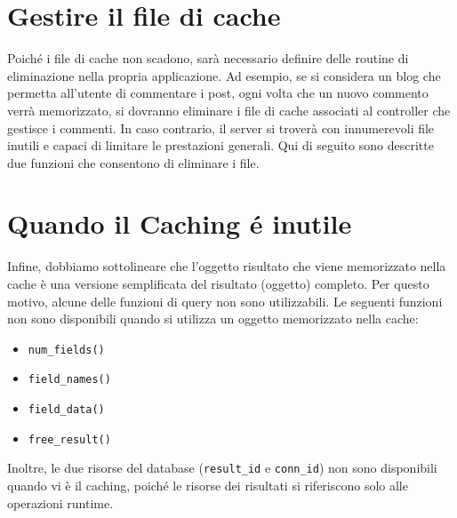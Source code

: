 \section*{Gestire il file di cache}
Poiché i file di cache non scadono, sarà necessario definire delle routine di eliminazione nella propria applicazione. Ad esempio, se si considera un blog che permetta all'utente di commentare i post, ogni volta che un nuovo commento verrà memorizzato, si dovranno eliminare i file di cache associati al controller che gestisce i commenti. In caso contrario, il server si troverà con innumerevoli file inutili e capaci di limitare le prestazioni generali. Qui di seguito sono descritte due funzioni che consentono di eliminare i file.

\section*{Quando il Caching \'e inutile}
Infine, dobbiamo sottolineare che l'oggetto risultato che viene memorizzato nella cache è una versione semplificata del risultato (oggetto) completo. Per questo motivo, alcune delle funzioni di query non sono utilizzabili. Le seguenti funzioni non sono disponibili quando si utilizza un oggetto memorizzato nella cache:

\begin{itemize}
\item \verb|num_fields()| 
\item \verb|field_names()| 
\item \verb|field_data()| 
\item \verb|free_result()| 
\end{itemize}

Inoltre, le due risorse del database (\verb|result_id| e \verb|conn_id|) non sono disponibili quando vi è il caching, poiché le risorse dei risultati si riferiscono solo alle operazioni runtime.


